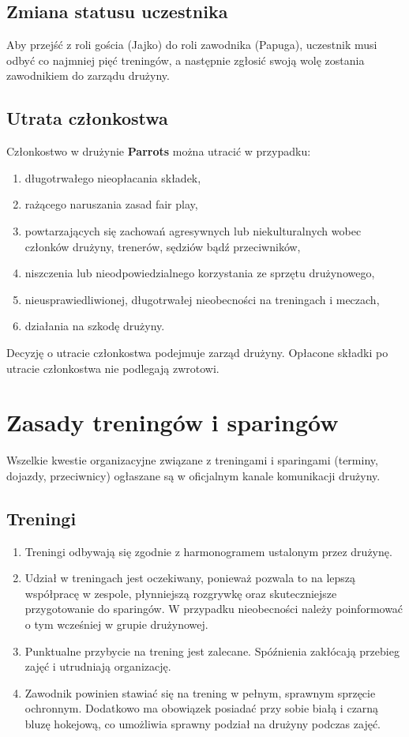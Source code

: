 \documentclass[12pt,a4paper]{article}
\let\stdsection\section
\renewcommand\section{\clearpage\stdsection}
\begin{document}
\subsection{Zmiana statusu uczestnika}
Aby przejść z roli gościa (Jajko) do roli zawodnika (Papuga), uczestnik musi odbyć co najmniej pięć treningów, a następnie zgłosić swoją wolę zostania zawodnikiem do zarządu drużyny.

\subsection{Utrata członkostwa}
Członkostwo w drużynie \textbf{Parrots} można utracić w przypadku:
\begin{enumerate}
    \item długotrwałego nieopłacania składek,
    \item rażącego naruszania zasad fair play,
    \item powtarzających się zachowań agresywnych lub niekulturalnych wobec członków drużyny, trenerów, sędziów bądź przeciwników,
    \item niszczenia lub nieodpowiedzialnego korzystania ze sprzętu drużynowego,
    \item nieusprawiedliwionej, długotrwałej nieobecności na treningach i meczach,
    \item działania na szkodę drużyny.
\end{enumerate}
Decyzję o utracie członkostwa podejmuje zarząd drużyny. Opłacone składki po utracie członkostwa nie podlegają zwrotowi.

\section{Zasady treningów i sparingów}
Wszelkie kwestie organizacyjne związane z treningami i sparingami (terminy, dojazdy, przeciwnicy) ogłaszane są w oficjalnym kanale komunikacji drużyny.

\subsection{Treningi}
\begin{enumerate}
  \item Treningi odbywają się zgodnie z harmonogramem ustalonym przez drużynę.
  \item Udział w treningach jest oczekiwany, ponieważ pozwala to na lepszą współpracę w zespole, płynniejszą rozgrywkę oraz skuteczniejsze przygotowanie do sparingów. W przypadku nieobecności należy poinformować o tym wcześniej w grupie drużynowej.
  \item Punktualne przybycie na trening jest zalecane. Spóźnienia zakłócają przebieg zajęć i utrudniają organizację.
  \item Zawodnik powinien stawiać się na trening w pełnym, sprawnym sprzęcie ochronnym. Dodatkowo ma obowiązek posiadać przy sobie białą i czarną bluzę hokejową, co umożliwia sprawny podział na drużyny podczas zajęć.

\end{enumerate}
\end{document}
